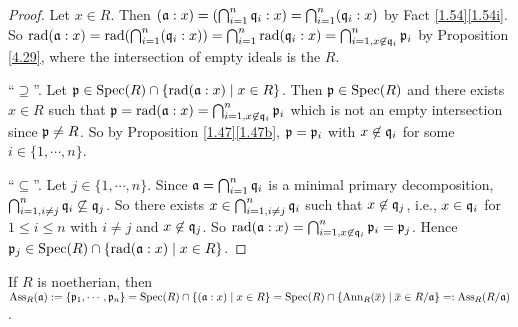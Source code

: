 \begin{proof}
    Let $x \in R$. Then $(\mathfrak{a}:x) = (\bigcap_{i=1}^{n} \mathfrak{q}_i:x) = \bigcap_{i=1}^{n} (\mathfrak{q}_i:x)$ by Fact \ref{1.54}\ref{1.54i}. So $\operatorname{rad}(\mathfrak{a}:x) = \operatorname{rad}(\bigcap_{i=1}^{n}(\mathfrak{q}_i:x)) = \bigcap_{i=1}^{n} \operatorname{rad}(\mathfrak{q}_i:x) = \bigcap_{i=1, x \not \in \mathfrak{q}_i}^{n} \mathfrak{p}_i$ by Proposition \ref{4.29}, where the intersection of empty ideals is the $R$. \par
    ``$\supseteq$''. Let $\mathfrak{p} \in \operatorname{Spec}(R) \cap \{\operatorname{rad}(\mathfrak{a}:x) \mid x \in R\}$. Then $\mathfrak{p} \in \operatorname{Spec}(R)$ and there exists $x \in R$ such that $\mathfrak{p} = \operatorname{rad}(\mathfrak{a}:x) = \bigcap_{i=1,x \not \in \mathfrak{q}_i}^{n} \mathfrak{p}_i$  which is not an empty intersection since $\mathfrak{p} \neq R$. So by Proposition \ref{1.47}\ref{1.47b}, $\mathfrak{p} = \mathfrak{p}_i$ with $x \not\in \mathfrak{q}_i$ for some $i \in \{1,\cdots,n\}$. \par
    ``$\subseteq$''. Let $j \in \{1,\cdots,n\}$. Since $\mathfrak{a} = \bigcap_{i=1}^{n}\mathfrak{q}_i$ is a minimal primary decomposition, $\bigcap_{i=1,i \neq j}^{n} \mathfrak{q}_i \not\subseteq \mathfrak{q}_j$. So there exists $x \in \bigcap_{i=1,i \neq j}^{n} \mathfrak{q}_i$ such that $x \not\in \mathfrak{q}_j$, i.e., $x \in \mathfrak{q}_i$ for $1 \leq i \leq n$ with $i \neq j$ and $x \not \in \mathfrak{q}_j$. So $\operatorname{rad}(\mathfrak{a}:x) = \bigcap_{i=1,x \not \in \mathfrak{q}_i}^{n} \mathfrak{p}_i = \mathfrak{p}_j$. Hence $\mathfrak{p}_j \in \operatorname{Spec}(R) \cap \{\operatorname{rad}(\mathfrak{a}:x) \mid x \in R\}$.
\end{proof}

\begin{theorem}\label{4.31}
    If $R$ is noetherian, then $\operatorname{Ass}_R(\ffa) := \{\ffp_1,\cdots,\ffp_n\} = \operatorname{Spec}(R) \cap \{(\ffa:x) \mid x \in R\} = \operatorname{Spec}(R) \cap \{\operatorname{Ann}_R(\overbar{x}) \mid \overbar{x} \in R/\ffa\} =: \operatorname{Ass}_R(R/\ffa)$.
\end{theorem}

